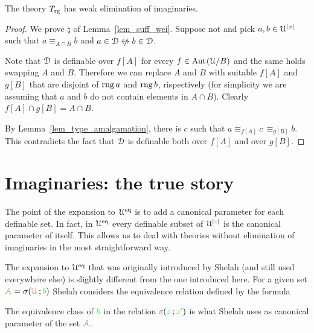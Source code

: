 \documentclass[creche.tex]{subfiles}
\begin{document}
\begin{lemma}
  The theory $T_{\rm rg}$ has weak elimination of imaginaries.
\end{lemma}

\begin{proof}
  We prove ${\natural}$ of Lemma~\ref{lem_suff_wei}.
  Suppose not and pick $a,b\in\EuScript U^{|x|}$ such that $a\equiv_{A\cap B}b$ and $a\in\D\niff b\in\D$.

  Note that $\EuScript D$ is definable over $f[A]$ for every $f\in{\rm Aut\kern.15ex}(\EuScript U/B)$ and the same holds swapping $A$ and $B$.
  Therefore we can replace $A$ and $B$ with suitable $f[A]$ and $g[B]$ that are disjoint of $\mathop{\rm rng} a$ and $\mathop{\rm rng} b$, rispectively (for simplicity we are assuming that $a$ and $b$ do not contain elements in $A\cap B$).
  Clearly $f[A]\cap g[B]=A\cap B$.

  By Lemma~\ref{lem_type_amalgamation}, there is $c$ such that $a\equiv_{f[A]} c\,\equiv_{g[B]} b$.
  This contradicts the fact that $\EuScript D$ is definable both over $f[A]$ and over $g[B]$.
\end{proof}



\section{Imaginaries: the true story}\label{imaginaries_long}

The point of the expansion to $\EuScript U^{{\rm eq}}$ is to add a canonical parameter for each definable set.
In fact, in $\EuScript U^{{\rm eq}}$ every definable subset of $\EuScript U^{|{\color{green} z}|}$ is the canonical parameter of itself.
This allows us to deal with theories without elimination of imaginaries in the most straightforward way.

The expansion to $\EuScript U^{{\rm eq}}$ that was originally introduced by Shelah (and still used everywhere else) is slightly different from the one introduced here.
For a given set ${\color{brown}\EuScript A}=\sigma({\color{brown}\EuScript U}\,;{\color{green} b})$ Shelah considers the equivalence relation defined by the formula


The equivalence class of ${\color{green} b}$ in the relation $\varepsilon({\color{green} z}\,;{\color{green} z'})$ is what Shelah uses as canonical parameter of the set ${\color{brown}\EuScript A}$.
\end{document}
